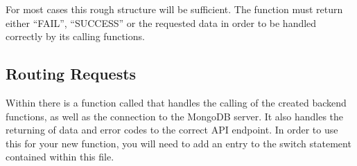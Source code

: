 \documentclass[letterpaper,10pt,english]{sphinxmanual}
\let\oldsubsection\subsection
\renewcommand{\subsection}{\needspace{6\baselineskip}\oldsubsection}
\begin{document}
\begin{sphinxVerbatim}[commandchars=\\\{\}]
    
      
         

     
           

            


       
         

     
\end{sphinxVerbatim}

For most cases this rough structure will be sufficient. The function
must return either “FAIL”, “SUCCESS” or the requested data in order to
be handled correctly by its calling functions.


\subsection{Routing Requests}
\label{\detokenize{docs/Expansion/api-expansion:routing-requests}}
Within  there is a function called
 that handles the calling of the created back\sphinxhyphen{}end
functions, as well as the connection to the MongoDB server. It also
handles the returning of data and error codes to the correct API
endpoint. In order to use this for your new function, you will need to
add an entry to the switch statement contained within this file.
\end{document}
